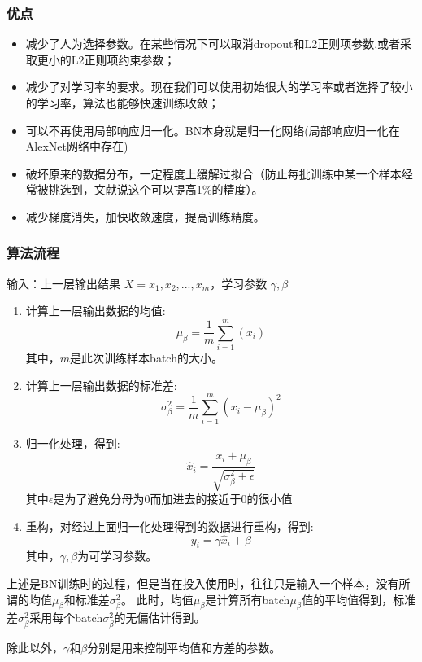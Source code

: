 \documentclass[UTF8]{ctexart}
\begin{document}
\subsubsection{优点}
\begin{itemize}
	\item 减少了人为选择参数。在某些情况下可以取消dropout和L2正则项参数,或者采取更小的L2正则项约束参数；
	\item 减少了对学习率的要求。现在我们可以使用初始很大的学习率或者选择了较小的学习率，算法也能够快速训练收敛；
	\item 可以不再使用局部响应归一化。BN本身就是归一化网络(局部响应归一化在AlexNet网络中存在) 
	\item 破坏原来的数据分布，一定程度上缓解过拟合（防止每批训练中某一个样本经常被挑选到，文献说这个可以提高1\%的精度）。 
	\item 减少梯度消失，加快收敛速度，提高训练精度。
\end{itemize}
\subsubsection{算法流程}
输入：上一层输出结果 $ X = {x_1, x_2, ..., x_m} $，学习参数 $ \gamma, \beta $
\begin{enumerate}
	\item 计算上一层输出数据的均值: $$\mu_{\beta} = \frac{1}{m} \sum_{i=1}^m(x_i)$$ 其中，$ m $是此次训练样本batch的大小。
	\item 计算上一层输出数据的标准差: $$\sigma_{\beta}^2 = \frac{1}{m} \sum_{i=1}^m (x_i - \mu_{\beta})^2$$ 
	\item 归一化处理，得到: $$\hat x_i = \frac{x_i + \mu_{\beta}}{\sqrt{\sigma_{\beta}^2 + \epsilon}}$$ 其中$ \epsilon $是为了避免分母为0而加进去的接近于0的很小值
	\item 重构，对经过上面归一化处理得到的数据进行重构，得到: $$y_i = \gamma \hat x_i + \beta$$  其中，$ \gamma, \beta $为可学习参数。
\end{enumerate}
\par 上述是BN训练时的过程，但是当在投入使用时，往往只是输入一个样本，没有所谓的均值$ \mu_{\beta} $和标准差$ \sigma_{\beta}^2 $。
此时，均值$ \mu_{\beta} $是计算所有batch$ \mu_{\beta} $值的平均值得到，标准差$ \sigma_{\beta}^2 $采用每个batch$ \sigma_{\beta}^2 $的无偏估计得到。
\par 除此以外，$\gamma$和$\beta$分别是用来控制平均值和方差的参数。

\newpage
\end{document}
